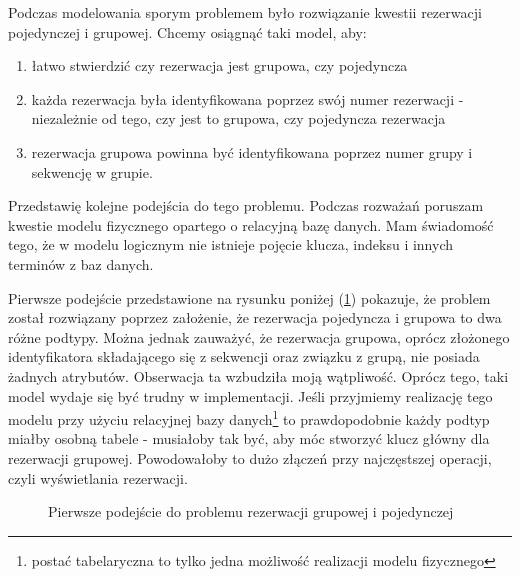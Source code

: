 \documentclass[a4paper,onecolumn,oneside,11pt,wide,floatssmall]{mwrep}
\theoremstyle{definition}
\theoremstyle{plain}%
\theoremstyle{remark}
\begin{document}
Podczas modelowania sporym problemem było rozwiązanie kwestii rezerwacji pojedynczej i grupowej. Chcemy osiągnąć taki model, aby:

\begin{enumerate}
  \item łatwo stwierdzić czy rezerwacja jest grupowa, czy pojedyncza
  \item każda rezerwacja była identyfikowana poprzez swój numer rezerwacji - niezależnie od tego, czy jest to grupowa, czy pojedyncza rezerwacja
  \item rezerwacja grupowa powinna być identyfikowana poprzez numer grupy i sekwencję w grupie.
\end{enumerate}

Przedstawię kolejne podejścia do tego problemu. Podczas rozważań poruszam kwestie modelu fizycznego opartego o relacyjną bazę danych. Mam świadomość tego, że w modelu logicznym nie istnieje pojęcie klucza, indeksu i innych terminów z baz danych. 

Pierwsze podejście przedstawione na rysunku poniżej (\ref{fig:db-logical-model-group-reservation-first-try}) pokazuje, że problem został rozwiązany poprzez założenie, że rezerwacja pojedyncza i grupowa to dwa różne podtypy. Można jednak zauważyć, że rezerwacja grupowa, oprócz złożonego identyfikatora składającego się z sekwencji oraz związku z grupą, nie posiada żadnych atrybutów. Obserwacja ta wzbudziła moją wątpliwość. Oprócz tego, taki model wydaje się być trudny w implementacji. Jeśli przyjmiemy realizację tego modelu przy użyciu relacyjnej bazy danych\footnote{postać tabelaryczna to tylko jedna możliwość realizacji modelu fizycznego} to prawdopodobnie każdy podtyp miałby osobną tabele - musiałoby tak być, aby móc stworzyć klucz główny dla rezerwacji grupowej. Powodowałoby to dużo złączeń przy najczęstszej operacji, czyli wyświetlania rezerwacji.

\begin{figure}[H]
  \begin{center}
  \end{center}
  \caption{Pierwsze podejście do problemu rezerwacji grupowej i pojedynczej}
  \label{fig:db-logical-model-group-reservation-first-try}
\end{figure}
\end{document}
